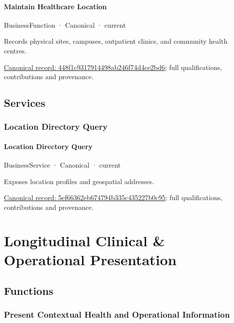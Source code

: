 \paragraph{Maintain Healthcare Location}

\label{element:448f1c9317914498ab246f74d4ce2bd6}
{\small BusinessFunction · Canonical · current}\par

Records physical sites, campuses, outpatient clinics, and community health centres.


{\footnotesize \href{../../../../continuum/business/business-function/448f1c9317914498ab246f74d4ce2bd6.md}{Canonical record: 448f1c9317914498ab246f74d4ce2bd6}; full qualifications, contributions and provenance.}\par
\subsection{Services}

\subsubsection{Location Directory Query}

\paragraph{Location Directory Query}

\label{element:5ef66362eb674794b335c435227b0c95}
{\small BusinessService · Canonical · current}\par

Exposes location profiles and geospatial addresses.


{\footnotesize \href{../../../../continuum/business/business-service/5ef66362eb674794b335c435227b0c95.md}{Canonical record: 5ef66362eb674794b335c435227b0c95}; full qualifications, contributions and provenance.}\par
\section{Longitudinal Clinical \& Operational Presentation}

\subsection{Functions}

\subsubsection{Present Contextual Health and Operational Information}

